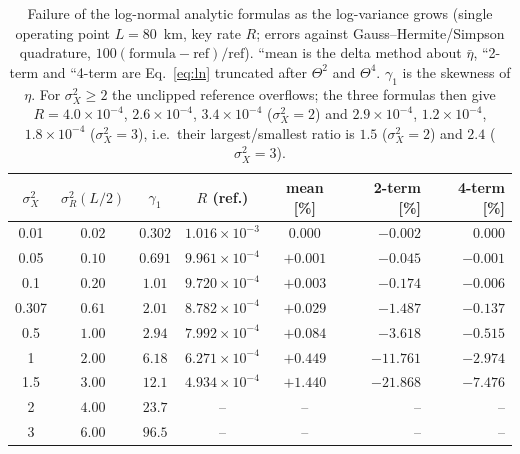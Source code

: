\documentclass[11pt,a4paper]{article}
\theoremstyle{plain}
\theoremstyle{remark}
\begin{document}
\begin{table}[htbp]
\centering\small
\caption{Failure of the log-normal analytic formulas as the log-variance grows (single operating point $L=80$~km, key rate $R$; errors against Gauss--Hermite/Simpson quadrature, $100(\text{formula}-\text{ref})/\text{ref}$). ``mean is the delta method about $\bar\eta$, ``2-term and ``4-term are Eq.~\eqref{eq:ln} truncated after $\Theta^2$ and $\Theta^4$. $\gamma_1$ is the skewness of $\eta$. For $\sigma_X^2\ge2$ the unclipped reference overflows; the three formulas then give $R=4.0\times10^{-4}$, $2.6\times10^{-4}$, $3.4\times10^{-4}$ ($\sigma_X^2=2$) and $2.9\times10^{-4}$, $1.2\times10^{-4}$, $1.8\times10^{-4}$ ($\sigma_X^2=3$), i.e.\ their largest/smallest ratio is $1.5$ ($\sigma_X^2=2$) and $2.4$ ($\sigma_X^2=3$).}
\label{tab:stress}
\begin{tabular}{cccccrr}
\toprule
$\sigma_X^2$ & $\sigma_R^2(L/2)$ & $\gamma_1$ & $R$ (ref.) & mean [\%] & 2-term [\%] & 4-term [\%]\\
\midrule
0.01 & $0.02$ & $0.302$ & $1.016\times10^{-3}$ & $0.000$ & $-0.002$ & $0.000$ \\
0.05 & $0.10$ & $0.691$ & $9.961\times10^{-4}$ & $+0.001$ & $-0.045$ & $-0.001$ \\
0.1 & $0.20$ & $1.01$ & $9.720\times10^{-4}$ & $+0.003$ & $-0.174$ & $-0.006$ \\
0.307 & $0.61$ & $2.01$ & $8.782\times10^{-4}$ & $+0.029$ & $-1.487$ & $-0.137$ \\
0.5 & $1.00$ & $2.94$ & $7.992\times10^{-4}$ & $+0.084$ & $-3.618$ & $-0.515$ \\
1 & $2.00$ & $6.18$ & $6.271\times10^{-4}$ & $+0.449$ & $-11.761$ & $-2.974$ \\
1.5 & $3.00$ & $12.1$ & $4.934\times10^{-4}$ & $+1.440$ & $-21.868$ & $-7.476$ \\
2 & $4.00$ & $23.7$ & -- & -- & -- & -- \\
3 & $6.00$ & $96.5$ & -- & -- & -- & -- \\

\bottomrule
\end{tabular}
\end{table}
\end{document}
